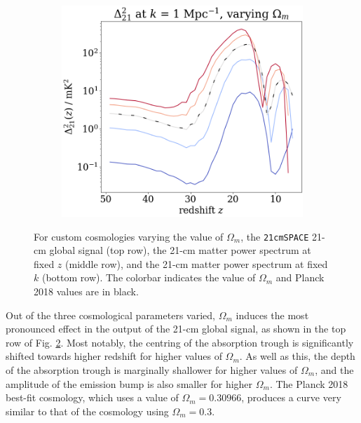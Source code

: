 \documentclass[floats,floatfix,showpacs,amssymb,prd,superscriptaddress,nofootinbib, 11pt]{revtex4-2} %
\newcommand{\code}{\texttt}
\begin{document}
\begin{figure}[H]
\begin{subfigure}[b]{0.45\textwidth}
     \end{subfigure}
     \hfill
     \begin{subfigure}[b]{0.45\textwidth}
         \centering
         \includegraphics[width=\textwidth]{images/simulation_results/power_spectrum_fixed_k_1_Om.png}
         \label{fig:power_spectrum_fixed_k_1_Om}
     \end{subfigure}
        \caption{For custom cosmologies varying the value of $\Omega_m$, the \code{21cmSPACE} 21-cm global signal (top row), the 21-cm matter power spectrum at fixed $z$ (middle row), and the 21-cm matter power spectrum at fixed $k$ (bottom row). The colorbar indicates the value of $\Omega_m$ and Planck 2018 values are in black.}
        \label{fig:simulation_results_Om}
\end{figure}


Out of the three cosmological parameters varied, $\Omega_m$ induces the most pronounced effect in the output of the 21-cm global signal, as shown in the top row of Fig. \ref{fig:simulation_results_Om}. Most notably, the centring of the absorption trough is significantly shifted towards higher redshift for higher values of $\Omega_m$. As well as this, the depth of the absorption trough is marginally shallower for higher values of $\Omega_m$, and the amplitude of the emission bump is also smaller for higher $\Omega_m$. The Planck 2018 best-fit cosmology, which uses a value of $\Omega_m = 0.30966$, produces a curve very similar to that of the cosmology using $\Omega_m = 0.3$.
\end{document}
